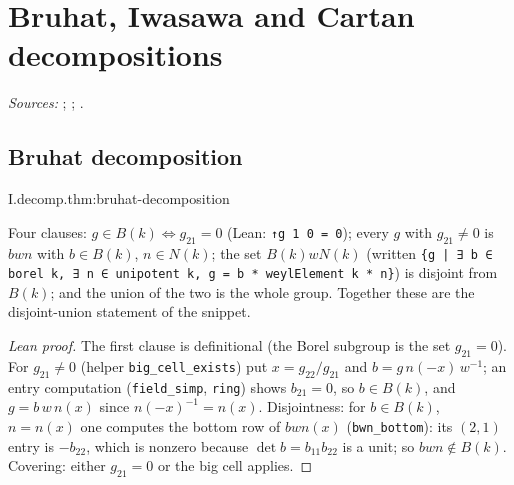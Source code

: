 
\chapter{Bruhat, Iwasawa and Cartan decompositions}\label{ch:ch-0-05-decompositions}

\noindent\emph{Sources:} \cite[§1]{Cas-p}; \cite[§2]{JL}; \cite{BumpH}.

\section{Bruhat decomposition}

\begin{theorem}
\end{theorem}
\begin{tfformal}{I.decomp.thm:bruhat-decomposition}
\begin{tffidelity}
Four clauses: $g\in B(k)\iff g_{21}=0$ (Lean: \texttt{↑g 1 0 = 0}); every $g$ with $g_{21}\neq0$ is $bwn$ with $b\in B(k)$, $n\in N(k)$; the set $B(k)wN(k)$ (written \texttt{\{g | ∃ b ∈ borel k, ∃ n ∈ unipotent k, g = b * weylElement k * n\}}) is disjoint from $B(k)$; and the union of the two is the whole group. Together these are the disjoint-union statement of the snippet.
\end{tffidelity}
\end{tfformal}
\begin{proof}[Lean proof]
The first clause is definitional (the Borel subgroup is the set $g_{21}=0$). For $g_{21}\ne0$ (helper \texttt{big\_cell\_exists}) put $x=g_{22}/g_{21}$ and $b=g\,n(-x)\,w^{-1}$; an entry computation (\texttt{field\_simp}, \texttt{ring}) shows $b_{21}=0$, so $b\in B(k)$, and $g=b\,w\,n(x)$ since $n(-x)^{-1}=n(x)$. Disjointness: for $b\in B(k)$, $n=n(x)$ one computes the bottom row of $bwn(x)$ (\texttt{bwn\_bottom}): its $(2,1)$ entry is $-b_{22}$, which is nonzero because $\det b=b_{11}b_{22}$ is a unit; so $bwn\notin B(k)$. Covering: either $g_{21}=0$ or the big cell applies.
\end{proof}

